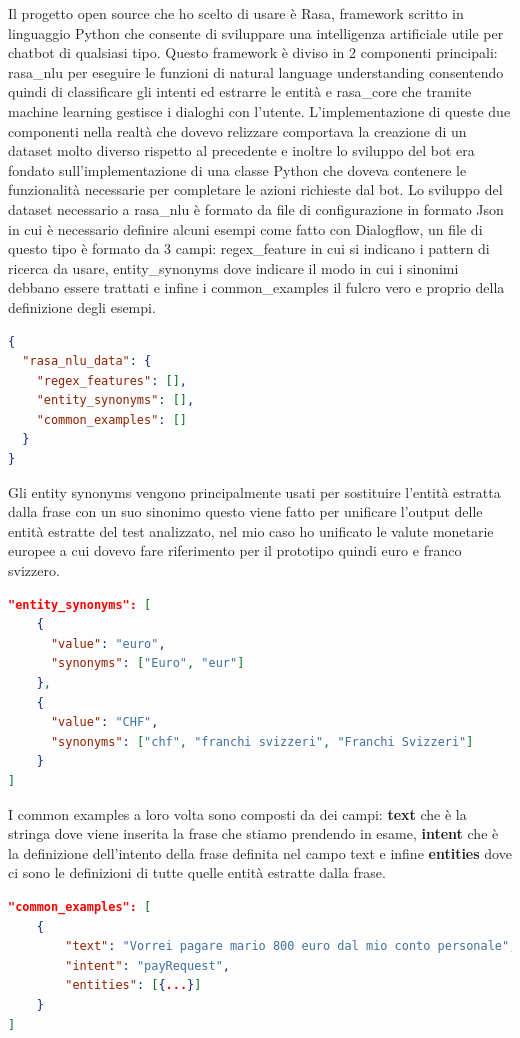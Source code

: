 Il progetto open source che ho scelto di usare è Rasa, framework scritto in linguaggio Python che consente di sviluppare una intelligenza artificiale utile per chatbot di qualsiasi tipo.
Questo framework è diviso in 2 componenti principali: rasa\_nlu per eseguire le funzioni di natural language understanding consentendo quindi di classificare gli intenti ed estrarre le entità e rasa\_core che tramite machine learning gestisce i dialoghi con l'utente.
L'implementazione di queste due componenti nella realtà che dovevo relizzare comportava la creazione di un dataset molto diverso rispetto al precedente e inoltre lo sviluppo del bot era fondato sull'implementazione di una classe Python che doveva contenere le funzionalità necessarie per completare le azioni richieste dal bot.
Lo sviluppo del dataset necessario a rasa\_nlu è formato da file di configurazione in formato Json in cui è necessario definire alcuni esempi come fatto con Dialogflow, un file di questo tipo è formato da 3 campi: regex\_feature in cui si indicano i pattern di ricerca da usare, entity\_synonyms dove indicare il modo in cui i sinonimi debbano essere trattati e infine i common\_examples il fulcro vero e proprio della definizione degli esempi.
\begin{lstlisting}[language=json,firstnumber=1]
{
  "rasa_nlu_data": {
    "regex_features": [],
    "entity_synonyms": [],
    "common_examples": []
  }
}
\end{lstlisting}
Gli entity synonyms vengono principalmente usati per sostituire l'entità estratta dalla frase con un suo sinonimo questo viene fatto per unificare l'output delle entità estratte del test analizzato, nel mio caso ho unificato le valute monetarie europee a cui dovevo fare riferimento per il prototipo quindi euro e franco svizzero.
\begin{lstlisting}[language=json,firstnumber=1]
"entity_synonyms": [
    {
      "value": "euro",
      "synonyms": ["Euro", "eur"]
    },
    {
      "value": "CHF",
      "synonyms": ["chf", "franchi svizzeri", "Franchi Svizzeri"]
    }
]
\end{lstlisting}
I common examples a loro volta sono composti da dei campi: \textbf{text} che è la stringa dove viene inserita la frase che stiamo prendendo in esame, \textbf{intent} che è la definizione dell'intento della frase definita nel campo text e infine \textbf{entities} dove ci sono le definizioni di tutte quelle entità estratte dalla frase.
\begin{lstlisting}[language=json,firstnumber=1]
"common_examples": [
    {
        "text": "Vorrei pagare mario 800 euro dal mio conto personale",
        "intent": "payRequest",
        "entities": [{...}]
    }
]
\end{lstlisting}
